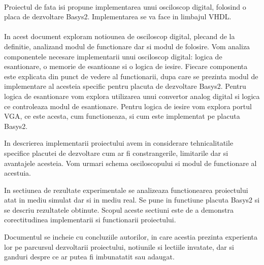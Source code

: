 \paragraph{}
Proiectul de fata isi propune implementarea unui osciloscop digital, folosind o placa de dezvoltare Basys2. Implementarea se va face in limbajul VHDL.

\paragraph{}
In acest document exploram notiounea de osciloscop digital, plecand de la definitie, analizand modul de functionare dar si modul de folosire. Vom analiza componentele necesare implementarii unui osciloscop digital: logica de esantionare, o memorie de esantioane si o logica de iesire. Fiecare componenta este explicata din punct de vedere al functionarii, dupa care se prezinta modul de implementare al acesteia specific pentru placuta de dezvoltare Basys2. Pentru logica de esantionare vom explora utilizarea unui convertor analog digital si logica ce controleaza modul de esantionare. Pentru logica de iesire vom explora portul VGA, ce este acesta, cum functioneaza, si cum este implementat pe placuta Basys2.

In descrierea implementarii proiectului avem in considerare tehnicalitatile specifice placutei de dezvoltare cum ar fi constrangerile, limitarile dar si avantajele acesteia. Vom urmari schema osciloscopului si modul de functionare al acestuia.

In sectiunea de rezultate experimentale se analizeaza functionearea proiectului atat in mediu simulat dar si in mediu real. Se pune in functiune placuta Basys2 si se descriu rezultatele obtinute. Scopul aceste sectiuni este de a demonstra corectitudinea implementarii si functionarii proiectului.

Documentul se incheie cu concluziile autorilor, in care acestia prezinta experienta lor pe parcursul dezvoltarii proiectului, notiunile si lectiile invatate, dar si ganduri despre ce ar putea fi imbunatatit sau adaugat.